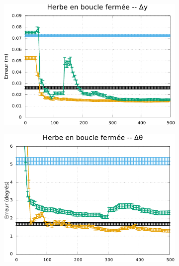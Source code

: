 \begin{figure}[htb]
\begin{subfigure}{0.29\paperwidth}
    \end{subfigure}
    \begin{subfigure}{0.29\paperwidth}
        \centering
        \includegraphics[type=pdf,ext=.pdf,read=.pdf,width=1.0\linewidth]{../plot/OdometryLWPR/grass_close_convergence_y}
    \end{subfigure}
    \begin{subfigure}{0.29\paperwidth}
        \centering
        \includegraphics[type=pdf,ext=.pdf,read=.pdf,width=1.0\linewidth]{../plot/OdometryLWPR/grass_close_convergence_yaw}
    \end{subfigure}
    \vspace{0.1cm}
    \newline
    \begin{subfigure}{0.29\paperwidth}

\end{subfigure}
\end{figure}
